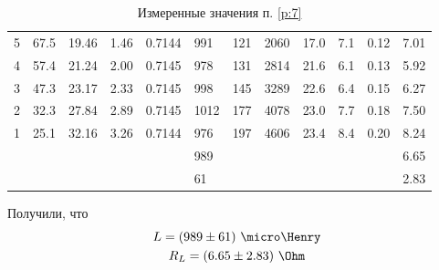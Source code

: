 \documentclass{report}
\begin{document}
\begin{enumerate}
\begin{table}[H]
\begin{tabular}{l|lllllllllll}
			      5 & 67.5                & 19.46                & 1.46          & 0.7144        & 991     & 121             & 2060                            & 17.0  & 7.1                & 0.12                  & 7.01          \\
			      4 & 57.4                & 21.24                & 2.00          & 0.7145        & 978     & 131             & 2814                            & 21.6  & 6.1                & 0.13                  & 5.92          \\
			      3 & 47.3                & 23.17                & 2.33          & 0.7145        & 998     & 145             & 3289                            & 22.6  & 6.4                & 0.15                  & 6.27          \\
			      2 & 32.3                & 27.84                & 2.89          & 0.7145        & 1012    & 177             & 4078                            & 23.0  & 7.7                & 0.18                  & 7.50          \\
			      1 & 25.1                & 32.16                & 3.26          & 0.7144        & 976     & 197             & 4606                            & 23.4  & 8.4                & 0.20                  & 8.24          \\
			      \hline
			        &                     &                      &               &               & 989     &                 &                                 &       &                    &                       & 6.65          \\
			        &                     &                      &               &               & 61      &                 &                                 &       &                    &                       & 2.83          \\
		      \end{tabular}
		      \caption{Измеренные значения п. \ref{p:7}}
		      \label{table:5}
	      \end{table}

	      Получили, что\\
	      \begin{gather}
		      L = (989 \pm 61)\ \micro\Henry \\
		      R_L = (6.65 \pm 2.83)\ \Ohm
	      \end{gather}


\end{enumerate}
\end{document}
